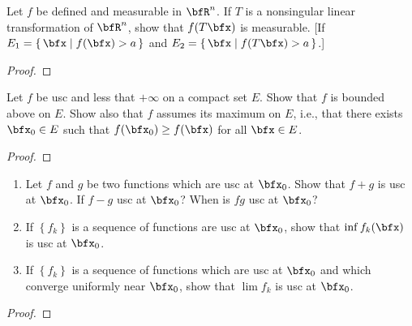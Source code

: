 \begin{problem}
Let $f$ be defined and measurable in $\bfR^n$. If $T$ is a nonsingular
linear transformation of $\bfR^n$, show that $f(T\bfx)$ is measurable. [If
$E_1=\left\{\,\bfx\;\middle|\; f(\bfx)>a\,\right\}$ and
$E_2=\left\{\,\bfx\;\middle|\;f(T\bfx)>a\,\right\}$.]
\end{problem}
\begin{proof}
\end{proof}
\newpage

\begin{problem}
Let $f$ be usc and less that $+\infty$ on a compact set $E$. Show that $f$
is bounded above on $E$. Show also that $f$ assumes its maximum on $E$,
i.e., that there exists $\bfx_0\in E$ such that $f(\bfx_0)\geq f(\bfx)$ for
all $\bfx\in E$.
\end{problem}
\begin{proof}
\end{proof}
\newpage

\begin{problem}
\begin{enumerate}[label=(\alph*)]
\item Let $f$ and $g$ be two functions which are usc at $\bfx_0$. Show that
  $f+g$ is usc at $\bfx_0$. If $f-g$ usc at $\bfx_0$? When is $fg$ usc at
  $\bfx_0$?
\item If $\left\{f_k\right\}$ is a sequence of functions are usc at
  $\bfx_0$, show that $\inf f_k(\bfx)$ is usc at $\bfx_0$.
\item If $\left\{f_k\right\}$ is a sequence of functions which are usc at
  $\bfx_0$ and which converge uniformly near $\bfx_0$, show that $\lim f_k$
  is usc at $\bfx_0$.
\end{enumerate}
\end{problem}
\begin{proof}
\end{proof}

